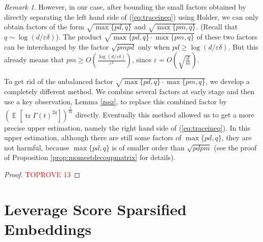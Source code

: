 \documentclass[11pt]{amsart}
\numberwithin{equation}{section}
\numberwithin{equation}{section}
\DeclareMathOperator{\E}{\mathbb{E}}
\DeclareMathOperator*{\tr}{tr}
\theoremstyle{remark}
\newtheorem{remark}[theorem]{Remark}
\theoremstyle{definition}
\begin{document}
\begin{remark}
However, in our case, after bounding the small factors obtained by directly separating the left hand side of (\ref{eq:traceineq}) using Holder, we can only obtain factors of the form $\sqrt{\max\{pd,q\}}$ and $\sqrt{\max\{pm,q\}}$. (Recall that $q \sim \log(d/\varepsilon\delta)$). The product $\sqrt{\max\{pd,q\} \cdot \max\{pm,q\}}$ of these two factors can be interchanged by the factor $\sqrt{pmpd}$ only when $pd \ge \log(d/\varepsilon\delta)$. But this already means that $pm \ge O(\frac{\log(d/\varepsilon\delta)}{\varepsilon^2})$, since $\varepsilon=O(\sqrt{\frac{d}{m}})$.

To get rid of the unbalanced factor $\sqrt{\max\{pd,q\} \cdot \max\{pm,q\}}$, we develop a completely different method. We combine several factors at early stage and then use a key observation, Lemma \ref{zssz}, to replace this combined factor by $(\E[\tr \Gamma(t)^{2q}])^{\frac{1}{2q}}$ directly. Eventually this method allowed us to get a more precise upper estimation, namely the right hand side of (\ref{eq:traceineq}). In this upper estimation, although there are still some factors of $\max\{pd,q\}$, they are not harmful, because $\max\{pd,q\}$ is of smaller order than $\sqrt{pdpm}$ (see the proof of Proposition \ref{prop:momestdecoupmatrix} for details). 




\end{remark}
\begin{proof}\textcolor{red}{TOPROVE 13}\end{proof}









 \section{Leverage Score Sparsified Embeddings} \label{sec:lessproofs}
\end{document}
